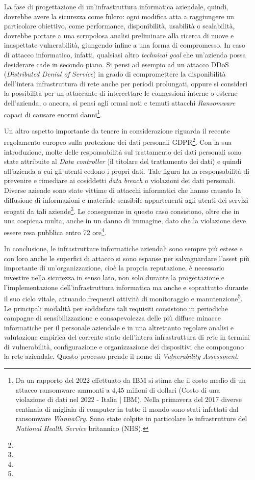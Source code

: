 \documentclass[target=mst,aauheader=]{thud}
\begin{document}
La fase di progettazione di un’infrastruttura informatica aziendale, quindi, dovrebbe avere la sicurezza come fulcro: ogni modifica atta a raggiungere un particolare obiettivo, come performance, disponibilità, usabilità o scalabilità, dovrebbe portare a una scrupolosa analisi preliminare alla ricerca di nuove e inaspettate vulnerabilità, giungendo infine a una forma di compromesso. In caso di attacco informatico, infatti, qualsiasi altro \textit{technical goal} che un’azienda possa desiderare cade in secondo piano. Si pensi ad esempio ad un attacco DDoS (\textit{Distributed Denial of Service}) in grado di compromettere la disponibilità dell’intera infrastruttura di rete anche per periodi prolungati, oppure si consideri la possibilità per un attaccante di intercettare le connessioni interne o esterne dell’azienda, o ancora, si pensi agli ormai noti e temuti attacchi \textit{Ransomware} capaci di causare enormi danni\footnote{Da un rapporto del 2022 effettuato da IBM si stima che il costo medio di un attacco ransomware ammonti a 4,45 milioni di dollari (Costo di una violazione di dati nel 2022 - Italia | IBM).
Nella primavera del 2017 diverse centinaia di migliaia di computer in tutto il mondo sono stati infettati dal ransomware \textit{WannaCry}. Sono state colpite in particolare le infrastrutture del \textit{National Health Service} britannico (NHS).
}.

Un altro aspetto importante da tenere in considerazione riguarda il recente regolamento europeo sulla protezione dei dati personali GDPR\footnote{}. Con la sua introduzione, molte delle responsabilità sul trattamento dei dati personali sono state attribuite al \textit{Data controller} (il titolare del trattamento dei dati) e quindi all’azienda a cui gli utenti cedono i propri dati. Tale figura ha la responsabilità di prevenire e rimediare ai cosiddetti \textit{data breach} o violazioni dei dati personali. Diverse aziende sono state vittime di attacchi informatici che hanno causato la diffusione di informazioni e materiale sensibile appartenenti agli utenti dei servizi erogati da tali aziende\footnote{}. Le conseguenze in questo caso consistono, oltre che in una cospicua multa, anche in un danno di immagine, dato che la violazione deve essere resa pubblica entro 72 ore\footnote{}.

In conclusione, le infrastrutture informatiche aziendali sono sempre più estese e con loro anche le superfici di attacco si sono espanse per salvaguardare l’asset più importante di un’organizzazione, cioè la propria reputazione, è necessario investire nella sicurezza in senso lato, non solo durante la progettazione e l’implementazione dell’infrastruttura informatica ma anche e soprattutto durante il suo ciclo vitale, attuando frequenti attività di monitoraggio e manutenzione\footnote{}. Le principali modalità per soddisfare tali requisiti consistono in periodiche campagne di sensibilizzazione e consapevolezza delle più diffuse minacce informatiche per il personale aziendale e in una altrettanto regolare analisi e valutazione empirica del corrente stato dell’intera infrastruttura di rete in termini di vulnerabilità, configurazione e organizzazione dei dispositivi che compongono la rete aziendale.
Questo processo prende il nome di \textit{Vulnerability Assessment}.
\end{document}
